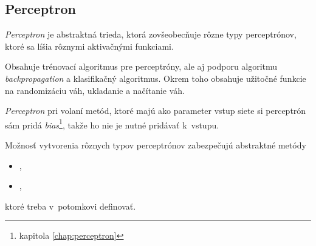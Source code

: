 \subsection{Perceptron}
\label{sect:perceptron}
\textit{Perceptron} je abstraktná trieda, ktorá zovšeobecňuje rôzne typy perceptrónov, ktoré sa líšia rôznymi aktivačnými funkciami.

Obsahuje trénovací algoritmus pre perceptróny, ale aj podporu algoritmu \textit{backpropagation} a klasifikačný algoritmus. Okrem toho obsahuje užitočné funkcie na randomizáciu váh, ukladanie a načítanie váh.

\textit{Perceptron} pri volaní metód, ktoré majú ako parameter vstup siete si perceptrón sám pridá \textit{bias}\footnote{kapitola \ref{chap:perceptron}}, takže ho nie je nutné pridávať k~vstupu.

Možnosť vytvorenia rôznych typov perceptrónov zabezpečujú abstraktné metódy 
\begin{itemize}
\item {},
\item {},
\end{itemize}
ktoré treba v~potomkovi definovať.

